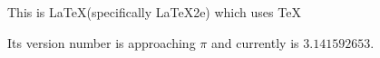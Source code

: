 \documentclass{article}
\begin{document}

This is \LaTeX (specifically \LaTeX2e) which uses \TeX

Its version number is approaching $\pi$ and currently is $3.141592653$.
\end{document}
